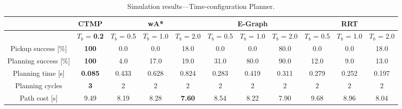 \documentclass[a4paper]{report}
\begin{document}
\begin{table}[t]
\begin{subtable}[h]{\textwidth}
\centering
\begin{adjustbox}{width=1\textwidth}
\begin{tabular}{|c||c||c|c|c||c|c|c||c|c|c|}
\hline
   & CTMP 
   & \multicolumn{3}{c|}{wA*}
   & \multicolumn{3}{c|}{E-Graph}
   & \multicolumn{3}{c|}{RRT}
   \\ \hline
   & $T_{b}$ = \textbf{0.2} 
   & $T_{b}$ = 0.5 & $T_{b}$ = 1.0 & $T_{b}$ = 2.0 
   & $T_{b}$ = 0.5 & $T_{b}$ = 1.0 & $T_{b}$ = 2.0 
   & $T_{b}$ = 0.5 & $T_{b}$ = 1.0 & $T_{b}$ = 2.0 
   \\ \hline
Pickup success [\%]                   
& \textbf{100} & 0.0 & 0.0 & 18.0 & 0.0 & 0.0 & 80.0 & 0.0 & 0.0 & 18.0 \\ \hline
Planning success [\%]                  
& \textbf{100} & 4.0 & 17.0 & 19.0 & 31.0 & 80.0 & 90.0 & 12.0 & 9.0 & 13.0 \\ \hline
Planning time [s]
& \textbf{0.085} & 0.433 & 0.628 & 0.824 & 0.283 & 0.419 & 0.311 & 0.279 & 0.252& 0.197\\ \hline
Planning cycles 
& \textbf{3} & 2 & 2 & 2 & 2 & 2 & 2 & 2 & 2 & 2 \\ \hline
Path cost [s]                         & 9.49        & 8.19          & 8.28          & \textbf{7.60}          & 8.54          & 8.22          & 7.90          & 9.68          & 8.96          & 8.04          \\ \hline
\end{tabular}
\end{adjustbox}
\caption{Simulation results---Time-configuration Planner.}
\label{tab:sim_results_p1}
\end{subtable}


\end{table}
\end{document}
